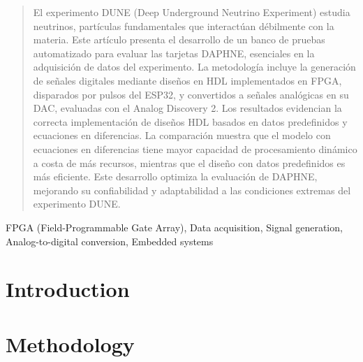 \documentclass[conference]{IEEEtran}
\begin{document}
\maketitle

\begin{abstract}
El experimento DUNE (Deep Underground Neutrino Experiment) estudia neutrinos, partículas fundamentales que interactúan débilmente con la materia. Este artículo presenta el desarrollo de un banco de pruebas automatizado para evaluar las tarjetas DAPHNE, esenciales en la adquisición de datos del experimento. La metodología incluye la generación de señales digitales mediante diseños en HDL implementados en FPGA, disparados por pulsos del ESP32, y convertidos a señales analógicas en su DAC, evaluadas con el Analog Discovery 2. Los resultados evidencian la correcta implementación de diseños HDL basados en datos predefinidos y ecuaciones en diferencias. La comparación muestra que el modelo con ecuaciones en diferencias tiene mayor capacidad de procesamiento dinámico a costa de más recursos, mientras que el diseño con datos predefinidos es más eficiente. Este desarrollo optimiza la evaluación de DAPHNE, mejorando su confiabilidad y adaptabilidad a las condiciones extremas del experimento DUNE.
\end{abstract}

\begin{IEEEkeywords}
FPGA (Field-Programmable Gate Array), Data acquisition, Signal generation, Analog-to-digital conversion, Embedded systems
\end{IEEEkeywords}







\section{Introduction}

%








\section{Methodology}
\end{document}
